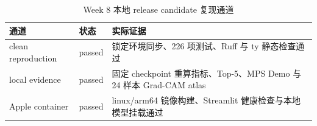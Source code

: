 \begin{table}[htbp]
\centering
\small
\caption{Week 8 本地 release candidate 复现通道}
\label{tab:week8-repro-zh}
\begin{tabular}{lp{}p{}}
\toprule
通道 & 状态 & 实际证据 \\
\midrule
clean reproduction & passed & 锁定环境同步、226 项测试、Ruff 与 ty 静态检查通过 \\
local evidence & passed & 固定 checkpoint 重算指标、Top-5、MPS Demo 与 24 样本 Grad-CAM atlas \\
Apple container & passed & linux/arm64 镜像构建、Streamlit 健康检查与本地模型挂载通过 \\
\bottomrule
\end{tabular}
\end{table}
